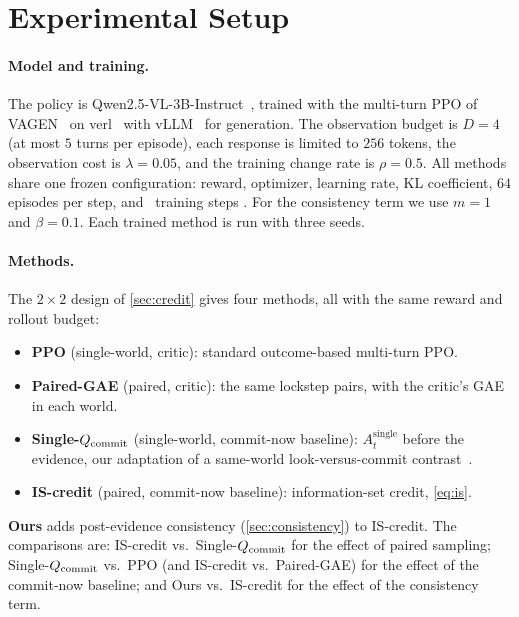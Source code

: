 \section{Experimental Setup}
\label{sec:setup}

\paragraph{Model and training.}
The policy is Qwen2.5-VL-3B-Instruct~\cite{qwen25vl2025}, trained with the multi-turn PPO of VAGEN~\cite{vagen2025} on verl~\cite{hybridflow2025} with vLLM~\cite{vllm2023} for generation.
The observation budget is $D = 4$ (at most $5$ turns per episode), each response is limited to $256$ tokens, the observation cost is $\lambda = 0.05$, and the training change rate is $\rho = 0.5$.
All methods share one frozen configuration: reward, optimizer, learning rate, KL coefficient, $64$ episodes per step, and \tbd\ training steps .
For the consistency term we use $m = 1$ and $\beta = 0.1$.
Each trained method is run with three seeds.

\paragraph{Methods.}
The $2{\times}2$ design of \cref{sec:credit} gives four methods, all with the same reward and rollout budget:
\begin{itemize}
\item \textbf{PPO} (single-world, critic): standard outcome-based multi-turn PPO.
\item \textbf{Paired-GAE} (paired, critic): the same lockstep pairs, with the critic's GAE in each world. 
\item \textbf{Single-$Q_{\mathrm{commit}}$} (single-world, commit-now baseline): $A^{\mathrm{single}}_t$ before the evidence, our adaptation of a same-world look-versus-commit contrast~\cite{seekvln2026}.
\item \textbf{IS-credit} (paired, commit-now baseline): information-set credit, \cref{eq:is}.
\end{itemize}
\textbf{Ours} adds post-evidence consistency (\cref{sec:consistency}) to IS-credit.
The comparisons are: IS-credit vs.\ Single-$Q_{\mathrm{commit}}$ for the effect of paired sampling; Single-$Q_{\mathrm{commit}}$ vs.\ PPO (and IS-credit vs.\ Paired-GAE) for the effect of the commit-now baseline; and Ours vs.\ IS-credit for the effect of the consistency term.

